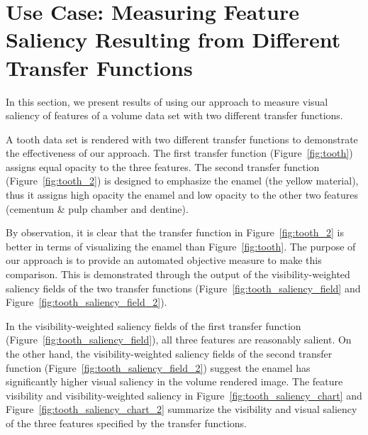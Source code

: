 \section{Use Case: Measuring Feature Saliency Resulting from Different Transfer Functions}
In this section, we present results of using our approach to measure visual saliency of features of a volume data set with two different transfer functions.

A tooth data set \cite{website:Roettger_volume_2013} is rendered with two different transfer functions to demonstrate the effectiveness of our approach. The first transfer function (Figure~\ref{fig:tooth}) assigns equal opacity to the three features.
The second transfer function (Figure~\ref{fig:tooth_2}) is designed to emphasize the enamel (the yellow material), thus it assigns high opacity the enamel and low opacity to the other two features (cementum \& pulp chamber and dentine).

By observation, it is clear that the transfer function in Figure~\ref{fig:tooth_2} is better in terms of visualizing the enamel than Figure~\ref{fig:tooth}. The purpose of our approach is to provide an automated objective measure to make this comparison. This is demonstrated through the output of the visibility-weighted saliency fields of the two transfer functions (Figure~\ref{fig:tooth_saliency_field} and Figure~\ref{fig:tooth_saliency_field_2}).

In the visibility-weighted saliency fields of the first transfer function (Figure~\ref{fig:tooth_saliency_field}), all three features are reasonably salient.
On the other hand, the visibility-weighted saliency fields of the second transfer function (Figure~\ref{fig:tooth_saliency_field_2}) suggest the enamel has significantly higher visual saliency in the volume rendered image.
The feature visibility and visibility-weighted saliency in Figure~\ref{fig:tooth_saliency_chart} and Figure~\ref{fig:tooth_saliency_chart_2} summarize the visibility and visual saliency of the three features specified by the transfer functions.

